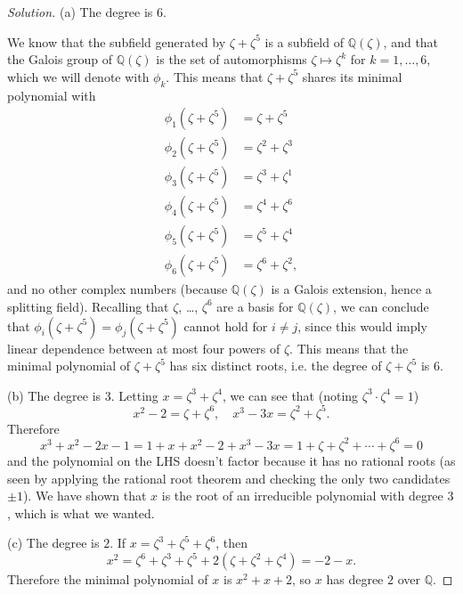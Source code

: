 \documentclass[10pt]{scrartcl}
\providecommand{\QQ}{\mathbb Q}
\newenvironment{soln}{\begin{proof}[Solution]}{\end{proof}}
\begin{document}
\begin{soln}
	(a) The degree is $\boxed 6$.
	
	We know that the subfield generated by $\zeta+\zeta^5$
	is a subfield of $\QQ(\zeta)$, and that the Galois group of
	$\QQ(\zeta)$ is the set of automorphisms $\zeta\mapsto\zeta^k$
	for $k=1,\dots,6$, which we will denote with $\phi_k$.
	This means that $\zeta+\zeta^5$ shares its minimal polynomial with
	\begin{align*}
		\phi_1(\zeta+\zeta^5) &= \zeta+\zeta^5\\
		\phi_2(\zeta+\zeta^5) &= \zeta^2+\zeta^3\\
		\phi_3(\zeta+\zeta^5) &= \zeta^3+\zeta^1\\
		\phi_4(\zeta+\zeta^5) &= \zeta^4+\zeta^6\\
		\phi_5(\zeta+\zeta^5) &= \zeta^5+\zeta^4\\
		\phi_6(\zeta+\zeta^5) &= \zeta^6+\zeta^2,
	\end{align*}
	and no other complex numbers
	(because $\QQ(\zeta)$ is a Galois extension, hence a splitting field).
	Recalling that $\zeta$, \dots, $\zeta^6$ are a basis for $\QQ(\zeta)$,
	we can conclude that $\phi_i(\zeta+\zeta^5)=\phi_j(\zeta+\zeta^5)$
	cannot hold for $i\ne j$, since this would imply linear dependence
	between at most four powers of $\zeta$. This means that
	the minimal polynomial of $\zeta+\zeta^5$ has six distinct roots,
	i.e. the degree of $\zeta+\zeta^5$ is $6$.
	
	(b) The degree is $\boxed{3}$. Letting $x = \zeta^3+\zeta^4$,
	we can see that (noting $\zeta^3\cdot\zeta^4 = 1$)
	\[x^2-2 = \zeta+\zeta^6,\quad x^3-3x = \zeta^2+\zeta^5.\]
	Therefore
	\[x^3+x^2-2x-1 = 1+x+x^2-2+x^3-3x=1+\zeta+\zeta^2+\cdots+\zeta^6=0\]
	and the polynomial on the LHS doesn't factor because
	it has no rational roots (as seen by applying the rational root theorem
	and checking the only two candidates $\pm 1$).
	We have shown that $x$ is the root of an irreducible polynomial
	with degree $3$, which is what we wanted.
	
	(c) The degree is $\boxed2$. If $x = \zeta^3+\zeta^5+\zeta^6$, then
	\[x^2 = \zeta^6 + \zeta^3 + \zeta^5 + 2(\zeta + \zeta^2 + \zeta^4)
	= -2 - x.\]
	Therefore the minimal polynomial of $x$ is $x^2 + x + 2$,
	so $x$ has degree $2$ over $\QQ$.
\end{soln}
\end{document}
